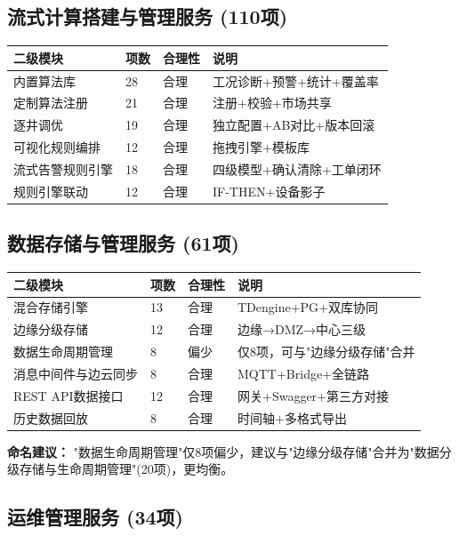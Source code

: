 \documentclass[11pt,a4paper]{ctexart}
\begin{document}
\subsection{流式计算搭建与管理服务 (110项)}

\begin{longtable}{p{3.5cm}p{2.5cm}p{2cm}p{4.5cm}}
\toprule\textbf{二级模块} & \textbf{项数} & \textbf{合理性} & \textbf{说明}\\\midrule
内置算法库 & 28 & \color{ok}合理 & 工况诊断+预警+统计+覆盖率 \\
定制算法注册 & 21 & \color{ok}合理 & 注册+校验+市场共享 \\
逐井调优 & 19 & \color{ok}合理 & 独立配置+AB对比+版本回滚 \\
可视化规则编排 & 12 & \color{ok}合理 & 拖拽引擎+模板库 \\
流式告警规则引擎 & 18 & \color{ok}合理 & 四级模型+确认清除+工单闭环 \\
规则引擎联动 & 12 & \color{ok}合理 & IF-THEN+设备影子 \\\bottomrule
\end{longtable}

\subsection{数据存储与管理服务 (61项)}

\begin{longtable}{p{3.5cm}p{2.5cm}p{2cm}p{4.5cm}}
\toprule\textbf{二级模块} & \textbf{项数} & \textbf{合理性} & \textbf{说明}\\\midrule
混合存储引擎 & 13 & \color{ok}合理 & TDengine+PG+双库协同 \\
边缘分级存储 & 12 & \color{ok}合理 & 边缘→DMZ→中心三级 \\
数据生命周期管理 & 8 & \color{warn}偏少 & 仅8项，可与"边缘分级存储"合并 \\
消息中间件与边云同步 & 8 & \color{ok}合理 & MQTT+Bridge+全链路 \\
REST API数据接口 & 12 & \color{ok}合理 & 网关+Swagger+第三方对接 \\
历史数据回放 & 8 & \color{ok}合理 & 时间轴+多格式导出 \\\bottomrule
\end{longtable}

\textbf{命名建议：} "数据生命周期管理"仅8项偏少，建议与"边缘分级存储"合并为"数据分级存储与生命周期管理"(20项)，更均衡。

\subsection{运维管理服务 (34项)}
\end{document}
